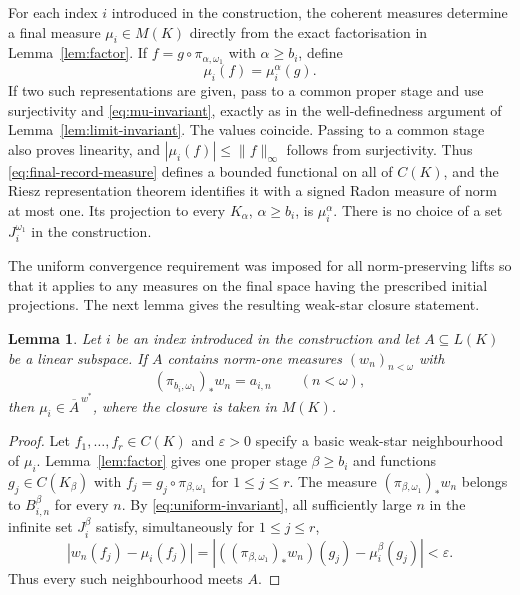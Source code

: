 \documentclass[a4paper,11pt]{amsart}
\theoremstyle{plain}
\newtheorem{lemma}[theorem]{Lemma}
\theoremstyle{definition}
\theoremstyle{remark}
\newcommand{\eps}{\varepsilon}
\numberwithin{equation}{section}
\begin{document}
For each index $i$ introduced in the construction, the coherent measures determine a final measure $\mu_i\in M(K)$ directly from the exact factorisation in Lemma~\ref{lem:factor}.  If
$f=g\circ\pi_{\alpha,\omega_1}$ with $\alpha\geqslant b_i$, define
\begin{equation}\label{eq:final-record-measure}
 \mu_i(f)=\mu_i^\alpha(g).
\end{equation}
If two such representations are given, pass to a common proper stage and use surjectivity and \eqref{eq:mu-invariant}, exactly as in the well-definedness argument of Lemma~\ref{lem:limit-invariant}.  The values coincide.  Passing to a common stage also proves linearity, and
$|\mu_i(f)|\leqslant\|f\|_\infty$ follows from surjectivity.  Thus \eqref{eq:final-record-measure} defines a bounded functional on all of $C(K)$, and the Riesz representation theorem identifies it with a signed Radon measure of norm at most one.  Its projection to every $K_\alpha$, $\alpha\geqslant b_i$, is $\mu_i^\alpha$.  There is no choice of a set $J_i^{\omega_1}$ in the construction.

The uniform convergence requirement was imposed for all norm-preserving lifts so that it applies to any measures on the final space having the prescribed initial projections.  The next lemma gives the resulting weak-star closure statement.

\begin{lemma}\label{lem:final-closure}
Let $i$ be an index introduced in the construction and let $A\subseteq L(K)$ be a linear subspace.  If $A$ contains norm-one measures $(w_n)_{n<\omega}$ with
\[
 (\pi_{b_i,\omega_1})_*w_n=a_{i,n}\qquad(n<\omega),
\]
then $\mu_i\in\overline A^{\,w^*}$, where the closure is taken in $M(K)$.
\end{lemma}
\begin{proof}
Let $f_1,\ldots,f_r\in C(K)$ and $\eps>0$ specify a basic weak-star neighbourhood of $\mu_i$.  Lemma~\ref{lem:factor} gives one proper stage $\beta\geqslant b_i$ and functions $g_j\in C(K_\beta)$ with
$f_j=g_j\circ\pi_{\beta,\omega_1}$ for $1\leqslant j\leqslant r$.  The measure
$(\pi_{\beta,\omega_1})_*w_n$ belongs to $B_{i,n}^\beta$ for every $n$.  By \eqref{eq:uniform-invariant}, all sufficiently large $n$ in the infinite set $J_i^\beta$ satisfy, simultaneously for $1\leqslant j\leqslant r$,
\[
 |w_n(f_j)-\mu_i(f_j)|
 =|((\pi_{\beta,\omega_1})_*w_n)(g_j)-\mu_i^\beta(g_j)|
 <\eps.
\]
Thus every such neighbourhood meets $A$.
\end{proof}
\end{document}
